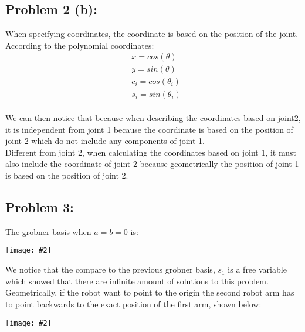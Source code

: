 \documentclass[11pt]{article}
\newcommand{\image}[2]{\texttt{[image: \#2]}}
\newcommand{\myalign}[1]{\begin{align*}#1\end{align*}}
\begin{document}
\subsection{Problem 2 (b):}
When specifying coordinates, the coordinate is based on the position of the joint. According to the polynomial coordinates:
\myalign{
    & x = cos(\theta) \\
    & y = sin(\theta) \\
    & c_i = cos(\theta_i) \\
    & s_i = sin(\theta_i)
} \\
We can then notice that because when describing the coordinates based on joint2, it is independent from joint 1 because the coordinate is 
based on the position of joint 2 which do not include any components of joint 1. \\
Different from joint 2, when calculating the coordinates based on joint 1, it must also include the coordinate of joint 2 because geometrically
the position of joint 1 is based on the position of joint 2. \\

\subsection{Problem 3:}
The grobner basis when $a = b = 0$ is: \\
\begin{center}
    \image{0.55}{img7}
\end{center}
We notice that the compare to the previous grobner basis, $s_1$ is a free variable which showed that 
there are infinite amount of solutions to this problem. Geometrically, if the robot want to point to the origin
the second robot arm has to point backwards to the exact position of the first arm, shown below: \\
\begin{center}
    \image{0.4}{img8}
\end{center}
\end{document}

